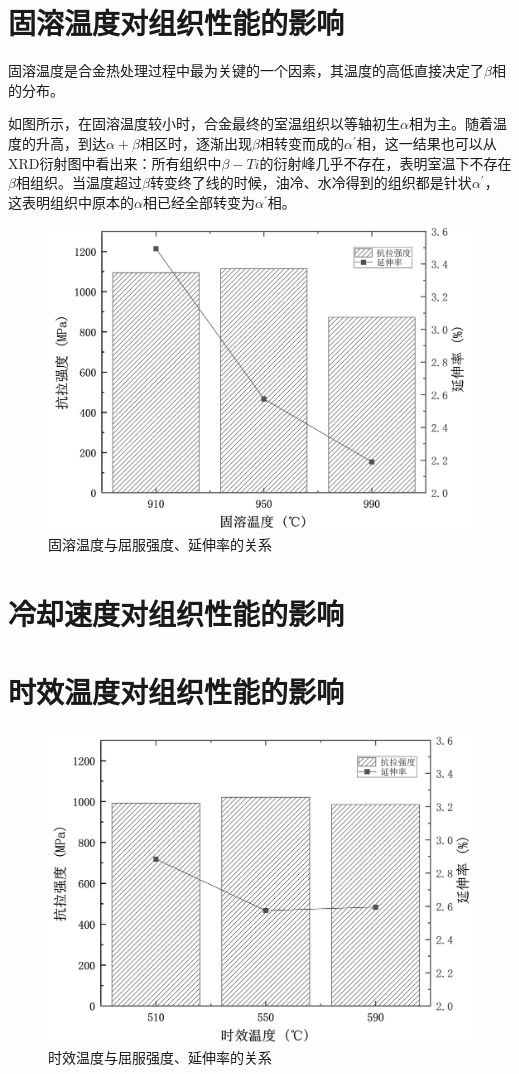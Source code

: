 \section{固溶温度对组织性能的影响}
固溶温度是\ti 合金热处理过程中最为关键的一个因素，其温度的高低直接决定了$\beta$相的分布。

如图所示，在固溶温度较小时，合金最终的室温组织以等轴初生$\alpha$相为主。随着温度的升高，到达$\alpha+\beta$相区时，逐渐出现$\beta$相转变而成的$\alpha^\prime$相，这一结果也可以从XRD衍射图中看出来：所有组织中$\beta-Ti$的衍射峰几乎不存在，表明室温下不存在$\beta$相组织。当温度超过$\beta $转变终了线的时候，油冷、水冷得到的组织都是针状$\alpha^\prime$，这表明组织中原本的$\alpha$相已经全部转变为$\alpha^\prime$相。

\begin{figure}[h!]
	\centering
	\includegraphics[width=0.7\linewidth]{pic/固溶温度与屈服强度、延伸率的关系}
	\caption{固溶温度与屈服强度、延伸率的关系}
	\label{fig:Gqy}
\end{figure}

\section{冷却速度对组织性能的影响}

\section{时效温度对组织性能的影响}
\begin{figure}[h!]
	\centering
	\includegraphics[width=0.7\linewidth]{pic/时效温度与屈服强度、延伸率的关系}
	\caption{时效温度与屈服强度、延伸率的关系}
	\label{fig:sqy}
\end{figure}


